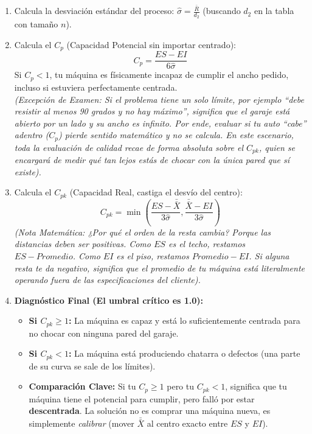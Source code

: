 \begin{enumerate}
    \item Calcula la desviación estándar del proceso: $\hat{\sigma} = \frac{\bar{R}}{d_2}$ (buscando $d_2$ en la tabla con tamaño $n$).
    \item Calcula el $C_p$ (Capacidad Potencial sin importar centrado):
    $$ C_p = \frac{ES - EI}{6 \hat{\sigma}} $$
    Si $C_p < 1$, tu máquina es físicamente incapaz de cumplir el ancho pedido, incluso si estuviera perfectamente centrada. \\
    \textit{(Excepción de Examen: Si el problema tiene un solo límite, por ejemplo ``debe resistir al menos 90 grados y no hay máximo'', significa que el garaje está abierto por un lado y su ancho es infinito. Por ende, evaluar si tu auto ``cabe'' adentro ($C_p$) pierde sentido matemático y no se calcula. En este escenario, toda la evaluación de calidad recae de forma absoluta sobre el $C_{pk}$, quien se encargará de medir qué tan lejos estás de chocar con la única pared que sí existe).}
    \item Calcula el $C_{pk}$ (Capacidad Real, castiga el desvío del centro):
    $$ C_{pk} = \min \left( \frac{ES - \bar{\bar{X}}}{3\hat{\sigma}} , \frac{\bar{\bar{X}} - EI}{3\hat{\sigma}} \right) $$
    \textit{(Nota Matemática: ¿Por qué el orden de la resta cambia? Porque las distancias deben ser positivas. Como $ES$ es el techo, restamos $ES - Promedio$. Como $EI$ es el piso, restamos $Promedio - EI$. Si alguna resta te da negativo, significa que el promedio de tu máquina está literalmente operando fuera de las especificaciones del cliente).}
    \item \textbf{Diagnóstico Final (El umbral crítico es 1.0):}
    \begin{itemize}
        \item \textbf{Si $C_{pk} \ge 1$:} La máquina es capaz y está lo suficientemente centrada para no chocar con ninguna pared del garaje.
        \item \textbf{Si $C_{pk} < 1$:} La máquina está produciendo chatarra o defectos (una parte de su curva se sale de los límites).
        \item \textbf{Comparación Clave:} Si tu $C_p \ge 1$ pero tu $C_{pk} < 1$, significa que tu máquina tiene el potencial para cumplir, pero falló por estar \textbf{descentrada}. La solución no es comprar una máquina nueva, es simplemente \textit{calibrar} (mover $\bar{\bar{X}}$ al centro exacto entre $ES$ y $EI$).
    \end{itemize}
\end{enumerate}

